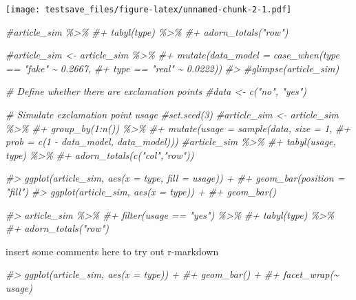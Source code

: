 \documentclass[
]{article}
\newenvironment{Shaded}{\begin{snugshade}}{\end{snugshade}}
\newcommand{\CommentTok}[1]{\textcolor[rgb]{0.56,0.35,0.01}{\textit{#1}}}
\begin{document}
\texttt{[image: testsave\_files/figure-latex/unnamed-chunk-2-1.pdf]}

\begin{Shaded}
\begin{Highlighting}[]
\CommentTok{\#article\_sim \%\textgreater{}\% }
\CommentTok{\#+     tabyl(type) \%\textgreater{}\% }
\CommentTok{\#+     adorn\_totals("row")}

\CommentTok{\#article\_sim \textless{}{-} article\_sim \%\textgreater{}\% }
\CommentTok{\#+     mutate(data\_model = case\_when(type == "fake" \textasciitilde{} 0.2667,}
\CommentTok{\#+                                   type == "real" \textasciitilde{} 0.0222))}
\CommentTok{\#\textgreater{} }
\CommentTok{\#glimpse(article\_sim)}
\end{Highlighting}
\end{Shaded}

\begin{Shaded}
\begin{Highlighting}[]
\CommentTok{\# Define whether there are exclamation points}
\CommentTok{\#data \textless{}{-} c("no", "yes")}
 
\CommentTok{\# Simulate exclamation point usage }
\CommentTok{\#set.seed(3)}
\CommentTok{\#article\_sim \textless{}{-} article\_sim \%\textgreater{}\%}
\CommentTok{\#+     group\_by(1:n()) \%\textgreater{}\% }
\CommentTok{\#+     mutate(usage = sample(data, size = 1, }
\CommentTok{\#+                           prob = c(1 {-} data\_model, data\_model)))}
\CommentTok{\#article\_sim \%\textgreater{}\% }
\CommentTok{\#+     tabyl(usage, type) \%\textgreater{}\% }
\CommentTok{\#+     adorn\_totals(c("col","row"))}
\end{Highlighting}
\end{Shaded}

\begin{Shaded}
\begin{Highlighting}[]
\CommentTok{\#\textgreater{} ggplot(article\_sim, aes(x = type, fill = usage)) + }
\CommentTok{\#+     geom\_bar(position = "fill")}
\CommentTok{\#\textgreater{} ggplot(article\_sim, aes(x = type)) + }
\CommentTok{\#+     geom\_bar()}
\end{Highlighting}
\end{Shaded}

\begin{Shaded}
\begin{Highlighting}[]
\CommentTok{\#\textgreater{} article\_sim \%\textgreater{}\% }
\CommentTok{\#+     filter(usage == "yes") \%\textgreater{}\% }
\CommentTok{\#+     tabyl(type) \%\textgreater{}\% }
\CommentTok{\#+     adorn\_totals("row")}
\end{Highlighting}
\end{Shaded}

insert some comments here to try out r-markdown

\begin{Shaded}
\begin{Highlighting}[]
\CommentTok{\#\textgreater{} ggplot(article\_sim, aes(x = type)) + }
\CommentTok{\#+     geom\_bar() + }
\CommentTok{\#+     facet\_wrap(\textasciitilde{} usage)}
\end{Highlighting}
\end{Shaded}
\end{document}
